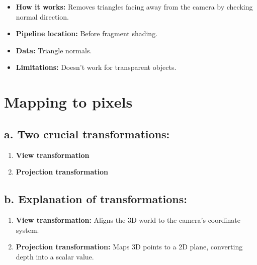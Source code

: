 \documentclass{article}
\begin{document}
\begin{itemize}
    \item \textbf{How it works:} Removes triangles facing away from the camera by checking normal direction.
    \item \textbf{Pipeline location:} Before fragment shading.
    \item \textbf{Data:} Triangle normals.
    \item \textbf{Limitations:} Doesn’t work for transparent objects.
\end{itemize}

\newpage
\section{Mapping to pixels}

\subsection{a. Two crucial transformations:}

\begin{enumerate}
    \item \textbf{View transformation}
    \item \textbf{Projection transformation}
\end{enumerate}

\subsection{b. Explanation of transformations:}

\begin{enumerate}
    \item \textbf{View transformation:} Aligns the 3D world to the camera’s coordinate system.
    \item \textbf{Projection transformation:} Maps 3D points to a 2D plane, converting depth into a scalar value.
\end{enumerate}
\end{document}
